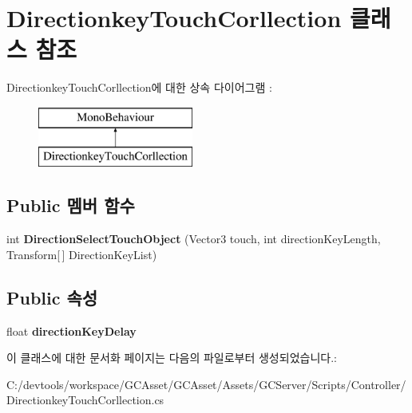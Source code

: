 \hypertarget{class_directionkey_touch_corllection}{}\section{Directionkey\+Touch\+Corllection 클래스 참조}
\label{class_directionkey_touch_corllection}
Directionkey\+Touch\+Corllection에 대한 상속 다이어그램 \+: \begin{figure}[H]
\begin{center}
\leavevmode
\includegraphics[height=2.000000cm]{class_directionkey_touch_corllection}
\end{center}
\end{figure}
\subsection*{Public 멤버 함수}
\begin{DoxyCompactItemize}
\item 
\hypertarget{class_directionkey_touch_corllection_afa1af5759b883a34d7a1cb322647fee5}{}int {\bfseries Direction\+Select\+Touch\+Object} (Vector3 touch, int direction\+Key\+Length, Transform\mbox{[}$\,$\mbox{]} Direction\+Key\+List)\label{class_directionkey_touch_corllection_afa1af5759b883a34d7a1cb322647fee5}

\end{DoxyCompactItemize}
\subsection*{Public 속성}
\begin{DoxyCompactItemize}
\item 
\hypertarget{class_directionkey_touch_corllection_a248298903643dd083f3119d7153b9e30}{}float {\bfseries direction\+Key\+Delay}\label{class_directionkey_touch_corllection_a248298903643dd083f3119d7153b9e30}

\end{DoxyCompactItemize}


이 클래스에 대한 문서화 페이지는 다음의 파일로부터 생성되었습니다.\+:\begin{DoxyCompactItemize}
\item 
C\+:/devtools/workspace/\+G\+C\+Asset/\+G\+C\+Asset/\+Assets/\+G\+C\+Server/\+Scripts/\+Controller/Directionkey\+Touch\+Corllection.\+cs\end{DoxyCompactItemize}
